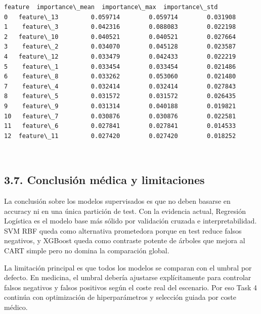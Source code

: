 \documentclass[11pt]{article}
\begin{document}
    \begin{Verbatim}[commandchars=\\\{\}]
       feature  importance\_mean  importance\_max  importance\_std
0   feature\_13         0.059714        0.059714        0.031908
1    feature\_3         0.042316        0.088083        0.022198
2   feature\_10         0.040521        0.040521        0.027664
3    feature\_2         0.034070        0.045128        0.023587
4   feature\_12         0.033479        0.042433        0.022219
5    feature\_1         0.033454        0.033454        0.021486
6    feature\_8         0.033262        0.053060        0.021480
7    feature\_4         0.032414        0.032414        0.027843
8    feature\_5         0.031572        0.031572        0.026435
9    feature\_9         0.031314        0.040188        0.019821
10   feature\_7         0.030876        0.030876        0.022581
11   feature\_6         0.027841        0.027841        0.014533
12  feature\_11         0.027420        0.027420        0.018252
    \end{Verbatim}

    
    \begin{center}
    \end{center}
    { \hspace*{\fill} \\}
    
    \subsection{3.7. Conclusión médica y
limitaciones}\label{conclusiuxf3n-muxe9dica-y-limitaciones}

La conclusión sobre los modelos supervisados es que no deben basarse en
accuracy ni en una única partición de test. Con la evidencia actual,
Regresión Logística es el modelo base más sólido por validación cruzada
e interpretabilidad. SVM RBF queda como alternativa prometedora porque
en test reduce falsos negativos, y XGBoost queda como contraste potente
de árboles que mejora al CART simple pero no domina la comparación
global.

La limitación principal es que todos los modelos se comparan con el
umbral por defecto. En medicina, el umbral debería ajustarse
explícitamente para controlar falsos negativos y falsos positivos según
el coste real del escenario. Por eso Task 4 continúa con optimización de
hiperparámetros y selección guiada por coste médico.
\end{document}
